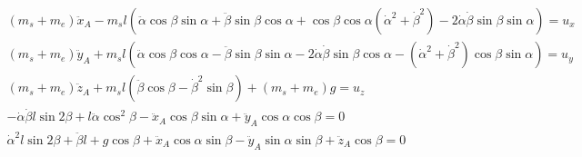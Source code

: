 \documentclass{article}
\begin{document}
\begin{align}
	(m_s + m_e)\ddot{x}_A - m_sl(\ddot{\alpha}\cos\beta\sin\alpha + \ddot{\beta}\sin\beta\cos\alpha + \cos\beta\cos\alpha(\dot{\alpha}^2+\dot{\beta}^2) - 2\dot{\alpha}\dot{\beta}\sin\beta\sin\alpha) = u_x\\
	(m_s + m_e)\ddot{y}_A +m_sl(\ddot{\alpha}\cos\beta\cos\alpha-\ddot{\beta}\sin\beta\sin\alpha-2\dot{\alpha}\dot{\beta}\sin\beta\cos\alpha-(\dot{\alpha}^2+\dot{\beta}^2)\cos\beta\sin\alpha) = u_y\\
	(m_s + m_e)\ddot{z}_A + m_sl(\ddot{\beta}\cos\beta - \dot{\beta}^2\sin\beta) + (m_s+m_e)g = u_z\\
	-\dot{\alpha}\dot{\beta}l\sin 2\beta + l\ddot{\alpha}\cos^2\beta - \ddot{x}_A\cos\beta\sin\alpha + \ddot{y}_A\cos\alpha\cos\beta = 0\\
	\dot{\alpha}^2l\sin 2\beta + \ddot{\beta}l + g\cos\beta + \ddot{x}_A\cos\alpha\sin\beta - \ddot{y}_A\sin\alpha\sin\beta + \ddot{z}_A\cos\beta = 0
\end{align}
\end{document}
